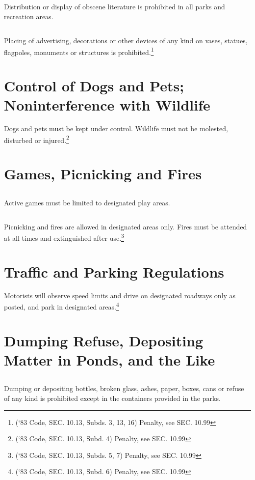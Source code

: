 \subsection{}
Distribution or display of obscene literature is prohibited in all parks and recreation areas.
\subsection{}
Placing of advertising, decorations or other devices of any kind on vases, statues, flagpoles, monuments or structures is prohibited.\footnote{(‘83 Code, SEC. 10.13, Subds. 3, 13, 16)  Penalty, see SEC. 10.99}
\section{Control of Dogs and Pets; Noninterference with Wildlife}
Dogs and pets must be kept under control.  Wildlife must not be molested, disturbed or injured.\footnote{(‘83 Code, SEC. 10.13, Subd. 4)  Penalty, see SEC. 10.99}
\section{Games, Picnicking and Fires}
\subsection{}
Active games must be limited to designated play areas.
\subsection{}
Picnicking and fires are allowed in designated areas only.  Fires must be attended at all times and extinguished after use.\footnote{(‘83 Code, SEC. 10.13, Subds. 5, 7)  Penalty, see SEC. 10.99}
\section{Traffic and Parking Regulations}
Motorists will observe speed limits and drive on designated roadways only as posted, and park in designated areas.\footnote{(‘83 Code, SEC. 10.13, Subd. 6)  Penalty, see SEC. 10.99}
\section{Dumping Refuse, Depositing Matter in Ponds, and the Like}
\subsection{}
Dumping or depositing bottles, broken glass, ashes, paper, boxes, cans or refuse of any kind is prohibited except in the containers provided in the parks.
